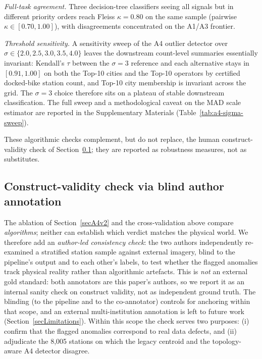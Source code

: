 \documentclass[11pt,a4paper]{article}
\begin{document}
\emph{Full-task agreement.} Three decision-tree classifiers seeing all
signals but in different priority orders reach Fleiss $\kappa = 0.80$
on the same sample (pairwise $\kappa \in [0.70, 1.00]$), with
disagreements concentrated on the A1/A3 frontier.

\emph{Threshold sensitivity.} A sensitivity sweep of the A4 outlier
detector over $\sigma \in \{2.0, 2.5, 3.0, 3.5, 4.0\}$ leaves the
downstream count-level summaries essentially invariant: Kendall's
$\tau$ between the $\sigma = 3$ reference and each alternative stays in
$[0.91, 1.00]$ on both the Top-10 cities and the Top-10 operators by
certified docked-bike station count, and Top-10 city membership is
invariant across the grid. The $\sigma = 3$ choice therefore sits on a
plateau of stable downstream classification. The full sweep and a
methodological caveat on the MAD scale estimator are reported in the
Supplementary Materials (Table~\ref{tab:a4-sigma-sweep}).

These algorithmic checks complement, but do not replace, the human
construct-validity check of Section~\ref{secHumanVal}; they are reported
as robustness measures, not as substitutes.

\subsection{Construct-validity check via blind author annotation}\label{secHumanVal}
The ablation of Section~\ref{secA4v2} and the cross-validation above
compare \emph{algorithms}; neither can establish which verdict matches the
physical world. We therefore add an \emph{author-led consistency check}: the
two authors independently re-examined a stratified station sample against
external imagery, blind to the pipeline's output and to each other's labels,
to test whether the flagged anomalies track physical reality rather than
algorithmic artefacts. This is \emph{not} an external gold standard: both
annotators are this paper's authors, so we report it as an internal sanity
check on construct validity, not as independent ground truth. The blinding
(to the pipeline and to the co-annotator) controls for anchoring within
that scope, and an external multi-institution annotation is left to future
work (Section~\ref{secLimitations}). Within this scope the check serves
two purposes: (i) confirm that the flagged anomalies correspond to real
data defects, and (ii) adjudicate
the 8{,}005 stations on which the legacy centroid and the topology-aware A4
detector disagree.
\end{document}
